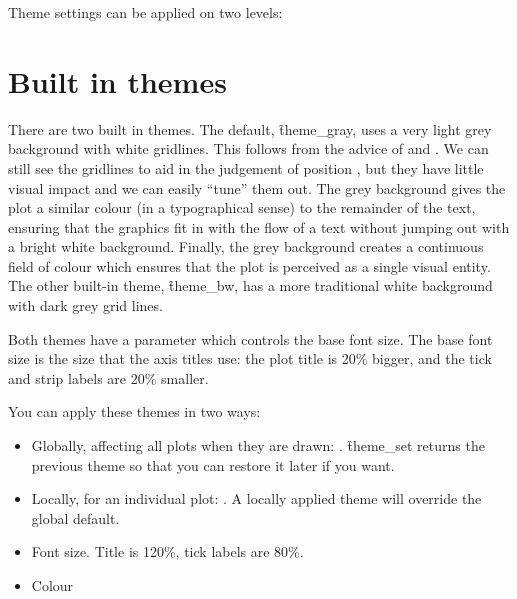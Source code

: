\noindent Theme settings can be applied on two levels:


\section{Built in themes}
\label{sec:built_in}

There are two built in themes.  The default, \f{theme_gray}, uses a very light grey background with white gridlines.  This follows from the advice of \citet{tufte:2006,tufte:1990,tufte:2001,tufte:1997} and \citet{brewer:1994,carr:2002,carr:1994,carr:1999}. We can still see the gridlines to aid in the judgement of position \citep{cleveland:1993a}, but they have little visual impact and we can easily ``tune'' them out. The grey background gives the plot a similar colour (in a typographical sense) to the remainder of the text, ensuring that the graphics fit in with the flow of a text without jumping out with a bright white background. Finally, the grey background creates a continuous field of colour which ensures that the plot is perceived as a single visual entity. The other built-in theme, \f{theme_bw}, has a more traditional white background with dark grey grid lines.  

Both themes have a  parameter which controls the base font size.  The base font size is the size that the axis titles use: the plot title is 20\% bigger, and the tick and strip labels are 20\% smaller.  

You can apply these themes in two ways:

\begin{itemize}
  \item Globally, affecting all plots when they are drawn: .  \f{theme_set} returns the previous theme so that you can restore it later if you want.
  
  \item Locally, for an individual plot:  .  A locally applied theme will override the global default.
\end{itemize}

\begin{itemize}
  \item Font size.  Title is 120\%, tick labels are 80\%.
  \item Colour
\end{itemize}

% 


